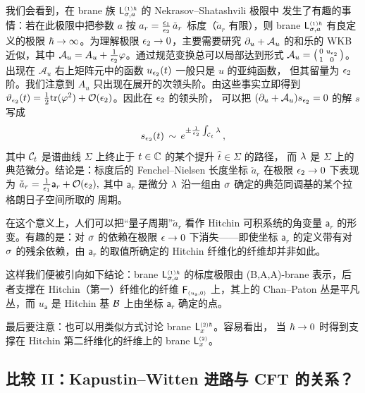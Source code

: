 我们会看到，在 brane 族 $\mathsf{L}_{\sigma,a}^{\scriptscriptstyle (1)\hbar}$ 的 Nekrasov--Shatashvili 极限中
发生了有趣的事情：若在此极限中把参数 $a$ 按
${a}_r=\frac{\epsilon_1}{\epsilon_2}\,\check{a}_r$ 标度（$\check{a}_r$ 有限），则 brane
$\mathsf{L}_{\sigma,a}^{\scriptscriptstyle(1)\hbar}$ 有良定义的极限 $\hbar\to \infty$。为理解极限
$\epsilon_2\to 0$，主要需要研究 $\partial_u+\mathcal{A}_u$ 的和乐的 WKB 近似，其中
$\mathcal{A}_u=A_u+\frac{1}{\epsilon_2}\varphi$。通过规范变换总可以局部达到形式
$\mathcal{A}_u=\big(\begin{smallmatrix} 0 & u_{\epsilon_2} \\ 1 & 0\end{smallmatrix}\big)$。
出现在 $\mathcal{A}_u$ 右上矩阵元中的函数 $u_{\epsilon_2}(t)$ 一般只是 $u$ 的亚纯函数，
但其留量为 $\epsilon_2$ 阶。我们注意到 $A_u$ 只出现在展开的次领头阶。由这些事实立即得到
$\vartheta_{\epsilon_2}(t)=\frac{1}{2}{\rm tr}(\varphi^2)+\mathcal{O}(\epsilon_2)$。因此在 $\epsilon_2$ 的领头阶，
可以把 $(\partial_u+\mathcal{A}_u)s_{\epsilon_2}=0$ 的解 $s$ 写成
\begin{equation}
s_{\epsilon_2}(t)\,\sim\, e^{\pm\frac{1}{\epsilon_2}\int_{\mathcal{C}_t} \lambda}\,,
\end{equation}
其中 $\mathcal{C}_t$ 是谱曲线 $\Sigma$ 上终止于 $t\in \mathbb{C}$ 的某个提升 $\hat{t}\in\Sigma$ 的路径，
而 $\lambda$ 是 $\Sigma$ 上的典范微分。结论是：标度后的 Fenchel--Nielsen 长度坐标
$\check{a}_r$ 在极限 $\epsilon_2\to 0$ 下表现为
$
\check{a}_r=\frac{1}{\epsilon_1}\mathsf{a}_r+\mathcal{O}(\epsilon_2),
$
其中 $\mathsf{a}_r$ 是微分 $\lambda$ 沿一组由 $\sigma$ 确定的典范同调基的某个拉格朗日子空间所取的
周期。

在这个意义上，人们可以把“量子周期”$\check{a}_r$ 看作 Hitchin 可积系统的角变量
$\mathsf{a}_r$ 的形变。有趣的是：对 $\sigma$ 的依赖在极限 ${\epsilon}\to 0$ 下消失——即使坐标
$\mathsf{a}_r$ 的定义带有对 $\sigma$ 的残余依赖，由 $\mathsf{a}_r$ 的取值所确定的 Hitchin
纤维化的纤维却并非如此。

这样我们便被引向如下结论：brane $\mathsf{L}_{\sigma,a}^{\scriptscriptstyle(1)\hbar}$ 的标度极限由
(B,A,A)-brane 表示，后者支撑在 Hitchin（第一）纤维化的纤维
$\mathsf{F}_{\scriptscriptstyle (u_{\mathsf{a}},0)}$ 上，其上的 Chan--Paton 丛是平凡丛，而
$u_\mathsf{a}$ 是 Hitchin 基 $\mathcal{B}$ 上由坐标 $\mathsf{a}_r$ 确定的点。

最后要注意：也可以用类似方式讨论 brane $\mathsf{L}_{x}^{\scriptscriptstyle(2)\hbar}$。容易看出，
当 ${\hbar}\to 0$ 时得到支撑在 Hitchin 第二纤维化的纤维上的 brane
$\mathsf{L}_{x}^{\scriptscriptstyle(2)}$。

\subsection{比较 II：Kapustin--Witten 进路与 CFT 的关系？}\label{compII}

